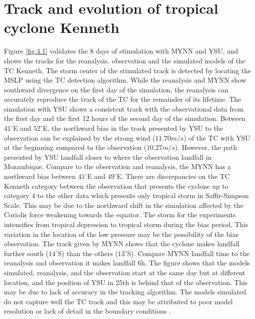 \documentclass[8pt,a4paper]{article}
\begin{document}
	\section{Track and evolution of tropical cyclone Kenneth}
	Figure \ref{fig:4.1} validates the 8 days of stimulation with MYNN and YSU, and shows the tracks for the reanalysis, observation and the simulated models of the TC Kenneth. 
	The storm center of the stimulated track is detected by locating the MSLP using the TC detection algorithm.
	While the reanalysis and MYNN show southward divergence on the first day of the simulation, the reanalysis can accurately reproduce the track of the TC for the remainder of its lifetime.
	The simulation with YSU shows a consistent track with the observational data from the first day and the first 12 hours of the second day of the simulation. Between $41^{\circ}$E and $52^{\circ}$E, the northward bias in the track presented by YSU to the observation can be explained by the strong wind ($11.70 m/s$) of the TC with YSU at the beginning compared to the observation ($10.27 m/s$). However, the path presented by YSU landfall closer to where the observation landfall in Mozambique. Compare to the observation and reanalysis, the MYNN has a northward bias between $41^{\circ}$E and $49^{\circ}$E. There are discrepancies on the TC Kenneth category between the observation that presents the cyclone up to category 4 to the other data which presents only tropical storm in Saffir-Simpson Scale. This may be due to the northward shift in the simulation affected by the Coriolis force weakening towards the equator. The storm for the experiments intensifies from tropical depression to tropical storm during the bias period. This variation in the location of the low pressure may be the possibility of the bias observation. The track given by MYNN shows that the cyclone makes landfall further south ($14^{\circ}$S) than the others ($13^{\circ}$S). Compare MYNN landfall time to the reanalysis and observation it makes landfall 6h. The figure shows that the models simulated, reanalysis, and the observation start at the same day but at different location, and the position of YSU in 25th is behind that of the observation. This may be due to lack of accuracy in the tracking algorithm. 
	The models simulated do not capture well the TC track and this may be attributed to poor model resolution or lack of detail in the boundary conditions \citep{mohanty2010simulation}.
	
\end{document}
